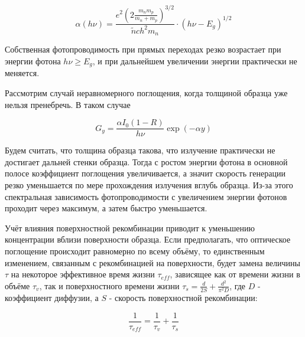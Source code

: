 \begin{equation}
\alpha(h \nu) = \frac{e^2 \left( 2 \frac{m_{n} m_{p}}{m_{n} + m_{p}} \right)^{3/2}}{\tilde{n} c h^2 m_{n}} \cdot (h \nu - E_{g})^{1/2}
\end{equation}

Собственная фотопроводимость при прямых переходах резко возрастает при энергии фотона $h \nu \ge E_{g}$, и при дальнейшем увеличении энергии практически не меняется.

Рассмотрим случай неравномерного поглощения, когда толщиной образца уже нельзя пренебречь. В таком случае

\begin{equation}
G_{y} = \frac{\alpha I_{0} (1-R)}{h \nu} \exp(-\alpha y)
\end{equation}

Будем считать, что толщина образца такова, что излучение практически не достигает дальней стенки образца. Тогда с ростом энергии фотона в основной полосе коэффициент поглощения увеличивается, а значит скорость генерации резко уменьшается по мере прохождения излучения вглубь образца. Из-за этого спектральная зависимость фотопроводимости с увеличением энергии фотонов проходит через максимум, а затем быстро уменьшается.

Учёт влияния поверхностной рекомбинации приводит к уменьшению концентрации вблизи поверхности образца. Если предполагать, что оптическое поглощение происходит равномерно по всему объёму, то единственным изменением, связанным с рекомбинацией на поверхности, будет замена величины $\tau$ на некоторое эффективное время жизни $\tau_{eff}$, зависящее как от времени жизни в объёме $\tau_{v}$, так и поверхностного времени жизни $\tau_{s} = \frac{d}{2 S} + \frac{d^2}{\pi^2 D}$, где $D$ - коэффициент диффузии, а $S$ - скорость поверхностной рекомбинации:

\begin{equation}
\frac{1}{\tau_{eff}} = \frac{1}{\tau_{v}} + \frac{1}{\tau_{s}}
\end{equation}

